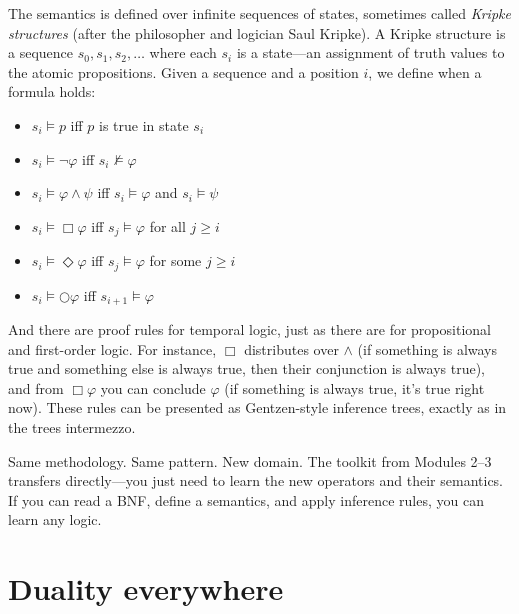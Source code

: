 \documentclass[11pt]{article}
\begin{document}
The semantics is defined over infinite sequences of states, sometimes called \emph{Kripke structures} (after the philosopher and logician Saul Kripke). A Kripke structure is a sequence $s_0, s_1, s_2, \ldots$ where each $s_i$ is a state---an assignment of truth values to the atomic propositions. Given a sequence and a position $i$, we define when a formula holds:
\begin{itemize}
  \item $s_i \models p$ iff $p$ is true in state $s_i$
  \item $s_i \models \lnot \varphi$ iff $s_i \not\models \varphi$
  \item $s_i \models \varphi \wedge \psi$ iff $s_i \models \varphi$ and $s_i \models \psi$
  \item $s_i \models \Box \varphi$ iff $s_j \models \varphi$ for all $j \geq i$
  \item $s_i \models \Diamond \varphi$ iff $s_j \models \varphi$ for some $j \geq i$
  \item $s_i \models \bigcirc \varphi$ iff $s_{i+1} \models \varphi$
\end{itemize}

And there are proof rules for temporal logic, just as there are for propositional and first-order logic. For instance, $\Box$ distributes over $\wedge$ (if something is always true and something else is always true, then their conjunction is always true), and from $\Box \varphi$ you can conclude $\varphi$ (if something is always true, it's true right now). These rules can be presented as Gentzen-style inference trees, exactly as in the trees intermezzo.

Same methodology. Same pattern. New domain. The toolkit from Modules 2--3 transfers directly---you just need to learn the new operators and their semantics. If you can read a BNF, define a semantics, and apply inference rules, you can learn any logic.

\section{Duality everywhere}
\end{document}
